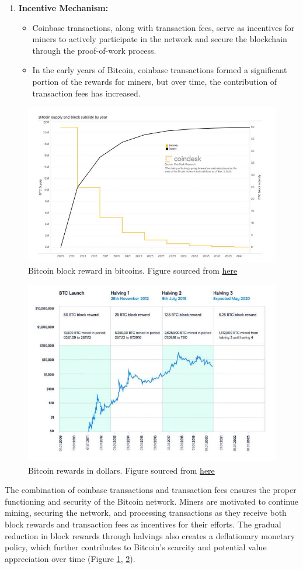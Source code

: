 \documentclass{report}
\begin{document}
\begin{enumerate}
\begin{itemize}
	\end{itemize}
	\item \textbf{Incentive Mechanism:}
	\begin{itemize}
		\item Coinbase transactions, along with transaction fees, serve as incentives for miners to actively participate in the network and secure the blockchain through the proof-of-work process.
		\item In the early years of Bitcoin, coinbase transactions formed a significant portion of the rewards for miners, but over time, the contribution of transaction fees has increased.
	\end{itemize}
\end{enumerate}
\begin{figure}[h!]
	\centering
	\includegraphics[width=0.6\linewidth]{Fig/F1}
	\caption{Bitcoin block reward in bitcoins. Figure sourced from  \href{https://www.coindesk.com/bitcoin-halving-explainer}{here}}
	\label{fig:f1}
\end{figure}

\begin{figure}[h!]
	\centering
	\includegraphics[width=0.6\linewidth]{Fig/F2}
	\caption{Bitcoin rewards in dollars. Figure sourced from  \href{https://www.cmcmarkets.com/en/learn-cryptocurrencies/bitcoin-halving}{here}}
	\label{fig:f2}
\end{figure}

The combination of coinbase transactions and transaction fees ensures the proper functioning and security of the Bitcoin network. Miners are motivated to continue mining, securing the network, and processing transactions as they receive both block rewards and transaction fees as incentives for their efforts. The gradual reduction in block rewards through halvings also creates a deflationary monetary policy, which further contributes to Bitcoin's scarcity and potential value appreciation over time (Figure \ref{fig:f1}, \ref{fig:f2}).
\end{document}

